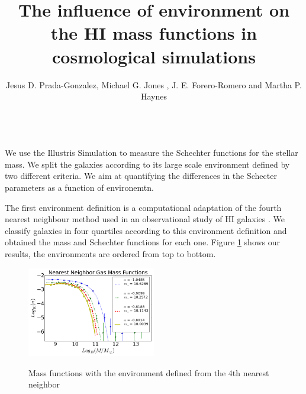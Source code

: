 \documentclass[preprint,proceedings]{rmaa}
\title{The influence of environment on the HI mass functions in cosmological simulations}
\author{Jesus D. Prada-Gonzalez\altaffilmark{1}, Michael G. Jones \altaffilmark{2}, J. E. Forero-Romero\altaffilmark{1} and Martha P. Haynes \altaffilmark{2}}
\begin{document}
\maketitle 


\\

We use the Illustris Simulation \citep{Vogelsberger}
to measure the Schechter functions for the stellar mass.
We split the galaxies according to its large scale environment
defined by two different criteria.
We aim at quantifying the differences in the Schecter parameters as a
function of environemtn.

The first environment definition is a computational
adaptation of the fourth nearest neighbour method used 
in an observational study of HI galaxies \citep{Jones}. 
We classify galaxies in four quartiles according to this environment
definition and obtained the mass and Schechter functions for each
one. Figure \ref{fig1} shows our results, the environments are ordered
from top to bottom.


\begin{figure}[h!]
\centering
\includegraphics[width=0.5\textwidth]{environment1}
\label{fig1}
\caption{Mass functions with the environment defined from the 4th
  nearest neighbor}
\centering
\end{figure}
\end{document}
